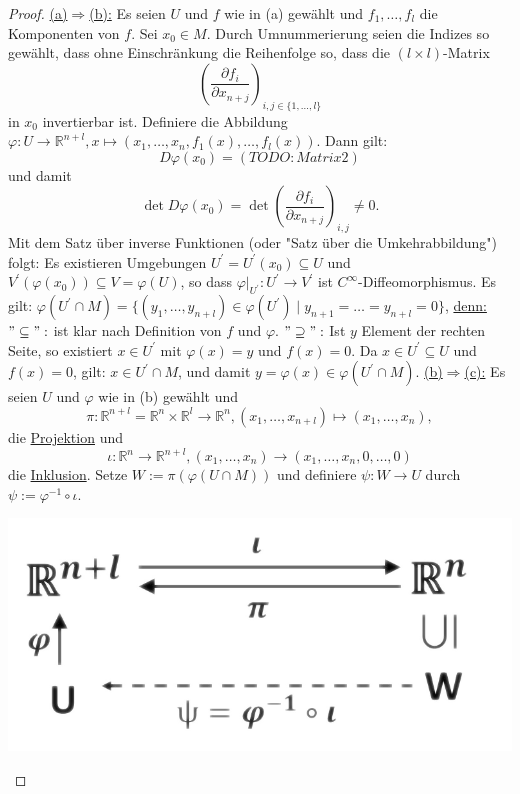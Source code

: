 \documentclass[a4paper,11pt,notitlepage]{report}
\theoremstyle{definition}
\newcommand{\R}{{\ensuremath{\mathbb{R}}}}
\begin{document}
\begin{proof}
		\underline{(a)$\Rightarrow$(b):} Es seien $U$ und $f$ wie in (a) gewählt und $f_1, \ldots, f_l$ die Komponenten von $f$. Sei $x_0 \in M$. Durch Umnummerierung seien die Indizes so gewählt, dass ohne Einschränkung die Reihenfolge so, dass die $(l \times l)$-Matrix 
		$$\left(\frac{\partial f_i}{\partial x_{n+j}}\right)_{i,j \in \{1, \ldots, l\}}$$
		in $x_0$ invertierbar ist.
		Definiere die Abbildung $\varphi \colon U \rightarrow \R^{n+l}, x \mapsto (x_1, \ldots, x_n, f_1(x), \ldots, f_l(x))$.
		Dann gilt:
		$$D \varphi(x_0)= (TODO:Matrix 2)$$ und damit 
		$$\det{D \varphi(x_0)} = \det{\left(\frac{\partial f_i}{\partial x_{n+j}}\right)_{i,j}} \neq 0.$$
		Mit dem Satz über inverse Funktionen (oder "Satz über die Umkehrabbildung") folgt:
		Es existieren Umgebungen $U^\prime = U^\prime(x_0) \subseteq U$ und $V^\prime(\varphi(x_0)) \subseteq V = \varphi(U)$, so dass
		$\varphi \big |_{U^\prime} \colon U^\prime \rightarrow V^\prime$ ist $C^\infty$-Diffeomorphismus.
		\newline
		Es gilt: $\varphi(U^\prime \cap M) = \{(y_1, \ldots, y_{n+l}) \in \varphi(U^\prime) \mid y_{n+1} = \ldots = y_{n+l}=0\}$,
		\underline{denn:} \newline $"\subseteq":$ ist klar nach Definition von $f$ und $\varphi$.
		\newline
		$"\supseteq":$ Ist $y$ Element der rechten Seite, so existiert $x \in U^\prime$ mit $\varphi(x)=y$ und $f(x)=0$. Da $x \in U^\prime \subseteq U$ und $f(x)=0$, gilt: $x \in U^\prime \cap M$, und damit $y = \varphi(x) \in \varphi(U^\prime \cap M)$.
		\newline
		 \underline{(b)$\Rightarrow$(c):} Es seien $U$ und $\varphi$ wie in (b) gewählt und
		 $$\pi \colon \R^{n+l} = \R^n \times \R^l \rightarrow \R^n, (x_1, \ldots, x_{n+l}) \mapsto (x_1, \ldots, x_n),$$
		 die \underline{Projektion} und
		 $$\iota \colon \R^n \rightarrow \R^{n+l}, (x_1, \ldots, x_n) \rightarrow (x_1, \ldots, x_n, 0, \ldots, 0)$$ die \underline{Inklusion}.
		 \newpage
		 Setze $W := \pi(\varphi(U \cap M))$ und definiere $\psi \colon W \rightarrow U$ durch $\psi := \varphi^{-1} \circ \iota$.
\begin{center}
	\includegraphics[scale=0.5]{images/Beweis_Satz_UMF_Diagramm.png}

\end{center}
\end{proof}
\end{document}
